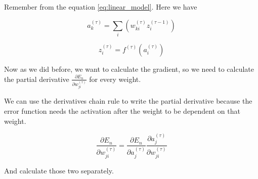 \documentclass[a4paper,12pt]{article}
\theoremstyle{mytheoremstyle}
\theoremstyle{mytheoremstyle}
\theoremstyle{myproblemstyle}
\begin{document}
    Remember from the equation \eqref{eq:linear_model}. Here we have

    \newcommand{\nlayer}{\left( \tau \right)}
    \newcommand{\nplayer}[1]{\left( \tau - {#1} \right)}
    \newcommand{\npblayer}[1]{\left( \tau + {#1} \right)}
    \begin{equation}
        a_{k}^{\nlayer} = \displaystyle\sum_{i} \left( w_{ki}^{\nlayer} z_{i}^{\nplayer{1}} \right)
    \end{equation}

    \begin{equation}
        z_{i}^{\left( \tau \right)} = f^{\left( \tau \right)} \left( a_{i}^{\left( \tau \right)} \right)
    \end{equation}

    \newcommand{\pd}[2]{\frac{\partial {#1}}{\partial {#2}}}
    \newcommand{\ajl}{a_{j^{\nlayer}}^{\nlayer}}
    \newcommand{\ajpl}[1]{a_{j^{\npblayer{#1}}}^{\npblayer{#1}}}
    Now as we did before, we want to calculate the gradient, so we need to
    calculate the partial derivative $ \pd{E_{n}}{w_{ji}^{\nlayer}} $ for every
    weight.

    We can use the derivatives chain rule to write the partial derivative
    because the error function needs the activation after the weight to be
    dependent on that weight.

    \begin{equation}
        \pd{E_{n}}{w_{ji}^{\nlayer}} = \pd{E_{n}}{a_{j}^{\nlayer}} \pd{a_{j}^{\nlayer}}{w_{ji}^{\nlayer}}
    \end{equation}

    And calculate those two separately.
\end{document}
